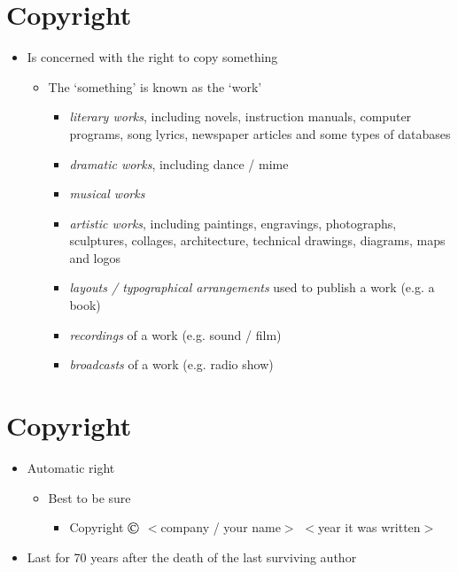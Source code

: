\documentclass{article}
\begin{document}
\section{Copyright}
\begin{itemize}
\item Is concerned with the right to copy something 
\begin{itemize}
\item The `something' is known as the `work'
\begin{itemize}
\item \emph{literary works}, including novels, instruction manuals, computer programs, song lyrics, newspaper articles and some types of databases 
\item \emph{dramatic works}, including dance / mime 
\item \emph{musical works}
\item \emph{artistic works}, including paintings, engravings, photographs, sculptures, collages, architecture, technical drawings, diagrams, maps and logos 
\item \emph{layouts / typographical arrangements} used to publish a work (e.g. a book)
\item \emph{recordings} of a work (e.g. sound / film)
\item \emph{broadcasts} of a work (e.g. radio show)
\end{itemize}
\end{itemize}
\end{itemize}



\section{Copyright}
\begin{itemize}
\item Automatic right
\begin{itemize}
\item Best to be sure
\begin{itemize}
\item Copyright $\copyright$ $<$company / your name$>$ $<$year it was written$>$
\end{itemize}
\end{itemize}
\item Last for 70 years after the death of the last surviving author
\end{itemize}
\end{document}
